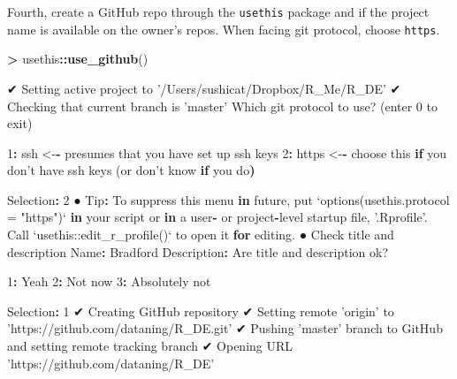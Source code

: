 \documentclass[]{book}
\newenvironment{Shaded}{\begin{snugshade}}{\end{snugshade}}
\newcommand{\ControlFlowTok}[1]{\textcolor[rgb]{0.13,0.29,0.53}{\textbf{#1}}}
\newcommand{\DataTypeTok}[1]{\textcolor[rgb]{0.13,0.29,0.53}{#1}}
\newcommand{\DecValTok}[1]{\textcolor[rgb]{0.00,0.00,0.81}{#1}}
\newcommand{\ErrorTok}[1]{\textcolor[rgb]{0.64,0.00,0.00}{\textbf{#1}}}
\newcommand{\KeywordTok}[1]{\textcolor[rgb]{0.13,0.29,0.53}{\textbf{#1}}}
\newcommand{\NormalTok}[1]{#1}
\newcommand{\OperatorTok}[1]{\textcolor[rgb]{0.81,0.36,0.00}{\textbf{#1}}}
\newcommand{\StringTok}[1]{\textcolor[rgb]{0.31,0.60,0.02}{#1}}
\begin{document}
Fourth, create a GitHub repo through the \texttt{usethis} package and if the project name is available on the owner's repos. When facing git protocol, choose \texttt{https}.

\begin{Shaded}
\begin{Highlighting}[]
\OperatorTok{>}\StringTok{ }\NormalTok{usethis}\OperatorTok{::}\KeywordTok{use_github}\NormalTok{()}

\NormalTok{✔ Setting active project to }\StringTok{'/Users/sushicat/Dropbox/R_Me/R_DE'}
\NormalTok{✔ Checking that current branch is }\StringTok{'master'}
\NormalTok{Which git protocol to use? (enter }\DecValTok{0}\NormalTok{ to exit) }

\DecValTok{1}\OperatorTok{:}\StringTok{ }\NormalTok{ssh   <-}\OperatorTok{-}\StringTok{ }\NormalTok{presumes that you have set up ssh keys}
\DecValTok{2}\OperatorTok{:}\StringTok{ }\NormalTok{https <-}\OperatorTok{-}\StringTok{ }\NormalTok{choose this }\ControlFlowTok{if}\NormalTok{ you don}\StringTok{'t have ssh keys (or don'}\NormalTok{t know }\ControlFlowTok{if}\NormalTok{ you do}\ErrorTok{)}

\NormalTok{Selection}\OperatorTok{:}\StringTok{ }\DecValTok{2}
\NormalTok{● Tip}\OperatorTok{:}\StringTok{ }\NormalTok{To suppress this menu }\ControlFlowTok{in}\NormalTok{ future, put}
  \StringTok{`}\DataTypeTok{options(usethis.protocol = "https")}\StringTok{`}
  \ControlFlowTok{in}\NormalTok{ your script or }\ControlFlowTok{in}\NormalTok{ a user}\OperatorTok{-}\StringTok{ }\NormalTok{or project}\OperatorTok{-}\NormalTok{level startup file, }\StringTok{'.Rprofile'}\NormalTok{.}
\NormalTok{  Call }\StringTok{`}\DataTypeTok{usethis::edit_r_profile()}\StringTok{`}\NormalTok{ to open it }\ControlFlowTok{for}\NormalTok{ editing.}
\NormalTok{● Check title and description}
\NormalTok{  Name}\OperatorTok{:}\StringTok{        }\NormalTok{Bradford}
\NormalTok{  Description}\OperatorTok{:}\StringTok{ }
\NormalTok{Are title and description ok?}

\DecValTok{1}\OperatorTok{:}\StringTok{ }\NormalTok{Yeah}
\DecValTok{2}\OperatorTok{:}\StringTok{ }\NormalTok{Not now}
\DecValTok{3}\OperatorTok{:}\StringTok{ }\NormalTok{Absolutely not}

\NormalTok{Selection}\OperatorTok{:}\StringTok{ }\DecValTok{1}
\NormalTok{✔ Creating GitHub repository}
\NormalTok{✔ Setting remote }\StringTok{'origin'}\NormalTok{ to }\StringTok{'https://github.com/dataning/R_DE.git'}
\NormalTok{✔ Pushing }\StringTok{'master'}\NormalTok{ branch to GitHub and setting remote tracking branch}
\NormalTok{✔ Opening URL }\StringTok{'https://github.com/dataning/R_DE'}
\end{Highlighting}
\end{Shaded}
\end{document}
